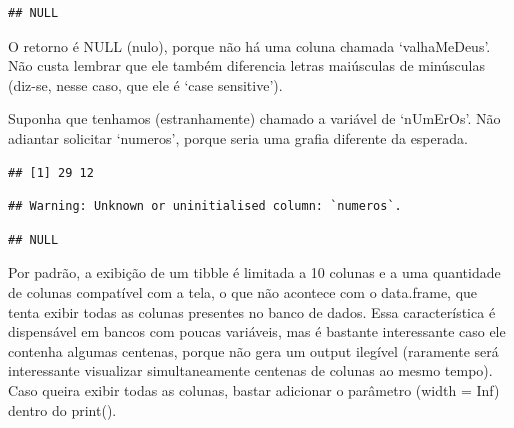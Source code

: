 \documentclass[
]{book}
\newenvironment{Shaded}{\begin{snugshade}}{\end{snugshade}}
\newcommand{\DataTypeTok}[1]{\textcolor[rgb]{0.13,0.29,0.53}{#1}}
\newcommand{\DecValTok}[1]{\textcolor[rgb]{0.00,0.00,0.81}{#1}}
\newcommand{\KeywordTok}[1]{\textcolor[rgb]{0.13,0.29,0.53}{\textbf{#1}}}
\newcommand{\NormalTok}[1]{#1}
\newcommand{\OperatorTok}[1]{\textcolor[rgb]{0.81,0.36,0.00}{\textbf{#1}}}
\newcommand{\StringTok}[1]{\textcolor[rgb]{0.31,0.60,0.02}{#1}}
\begin{document}
\begin{verbatim}
## NULL
\end{verbatim}

O retorno é NULL (nulo), porque não há uma coluna chamada `valhaMeDeus'. Não custa lembrar que ele também diferencia letras maiúsculas de minúsculas (diz-se, nesse caso, que ele é `case sensitive').

Suponha que tenhamos (estranhamente) chamado a variável de `nUmErOs'. Não adiantar solicitar `numeros', porque seria uma grafia diferente da esperada.

\begin{Shaded}
\end{Shaded}

\begin{verbatim}
## [1] 29 12
\end{verbatim}

\begin{Shaded}
\end{Shaded}

\begin{verbatim}
## Warning: Unknown or uninitialised column: `numeros`.
\end{verbatim}

\begin{verbatim}
## NULL
\end{verbatim}

Por padrão, a exibição de um tibble é limitada a 10 colunas e a uma quantidade de colunas compatível com a tela, o que não acontece com o data.frame, que tenta exibir todas as colunas presentes no banco de dados. Essa característica é dispensável em bancos com poucas variáveis, mas é bastante interessante caso ele contenha algumas centenas, porque não gera um output ilegível (raramente será interessante visualizar simultaneamente centenas de colunas ao mesmo tempo). Caso queira exibir todas as colunas, bastar adicionar o parâmetro (width = Inf) dentro do print().
\end{document}
